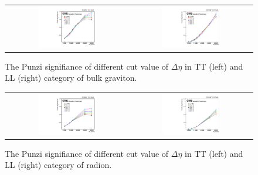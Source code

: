 \begin{figure}[t]
  \centering
  \begin{tabular}{cc}
    \includegraphics[width=0.5\textwidth]{Figures/deta/bulk/dEtaTT.pdf} &
       \includegraphics[width=0.5\textwidth]{Figures/deta/bulk/dEtaLL.pdf}
  \end{tabular}
  \caption{The Punzi signifiance of different cut value of $\Delta \eta$ in TT (left) and LL (right) category of bulk graviton.}
  \label{fig:hvt_brs}
\end{figure}

\begin{figure}[t]
  \centering
  \begin{tabular}{cc}
    \includegraphics[width=0.5\textwidth]{Figures/deta/rad/dEtaTT.pdf} &
       \includegraphics[width=0.5\textwidth]{Figures/deta/rad/dEtaLL.pdf}
  \end{tabular}
  \caption{The Punzi signifiance of different cut value of $\Delta \eta$ in TT (left) and LL (right) category of radion.}
  \label{fig:hvt_brs}
\end{figure}

